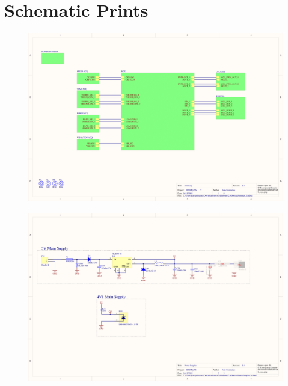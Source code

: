 \chapter{Schematic Prints}\label{ch:hw-proj-appendix}

	\begin{figure}[htbp]
		\centering
		\includegraphics[width=1.3\textwidth, angle=270]{figuras/fig-schematic-1}
	\end{figure}

	\begin{figure}[htbp]
		\centering
		\includegraphics[width=1.3\textwidth, angle=270]{figuras/fig-schematic-2}
	\end{figure}

